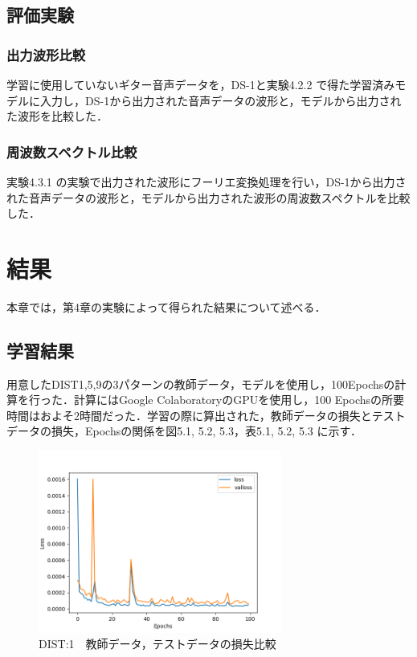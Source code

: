 \documentclass{jreport}		%
\begin{document}
\section{評価実験}
\subsection{出力波形比較}
学習に使用していないギター音声データを，DS-1と実験4.2.2 で得た学習済みモデルに入力し，DS-1から出力された音声データの波形と，モデルから出力された波形を比較した．

\subsection{周波数スペクトル比較}
実験4.3.1 の実験で出力された波形にフーリエ変換処理を行い，DS-1から出力された音声データの波形と，モデルから出力された波形の周波数スペクトルを比較した．

\chapter{結果}
本章では，第4章の実験によって得られた結果について述べる．

\section{学習結果}
用意したDIST1,5,9の3パターンの教師データ，モデルを使用し，100Epochsの計算を行った．計算にはGoogle ColaboratoryのGPUを使用し，100 Epochsの所要時間はおよそ2時間だった．学習の際に算出された，教師データの損失とテストデータの損失，Epochsの関係を図5.1, 5.2, 5.3，表5.1, 5.2, 5.3 に示す．
\begin{figure}[htbp]
 \begin{center}
  \includegraphics[width=80mm]{gain1_loss_hikaku.png}
 \end{center}
 \caption{DIST:1　教師データ，テストデータの損失比較}
 \label{fig:one}
\end{figure}
\end{document}
